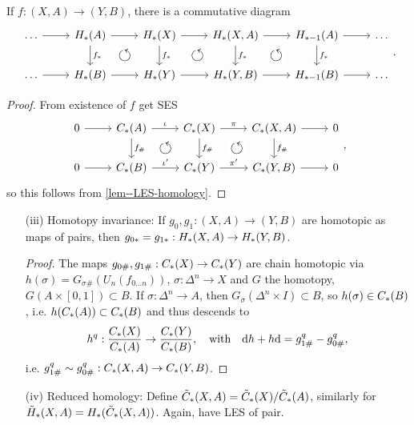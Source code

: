 \documentclass[a4paper,11pt]{article}
\begin{document}
				\begin{cor}
					If $f:(X,A)\rightarrow (Y,B)$, there is a commutative diagram
					\begin{equation*}
						\begin{tikzcd}
							\dots\ar[r]& \hg{A}\ar[d,"f_\ast"]\ar[r]& \hg{X}\ar[d,"f_\ast"]\ar[r]& \hg{X,A}\ar[d,"f_\ast"]\ar[r]& \hg[\ast-1]{A}\ar[d,"f_\ast"]\ar[r]& \dots\\
							\dots\ar[r]& \hg{B}\arrow[ur, phantom, "\scalebox{1.5}{$\circlearrowleft$}" description]\ar[r]& \hg{Y}\arrow[ur, phantom, "\scalebox{1.5}{$\circlearrowleft$}" description]\ar[r]& \hg{Y,B}\arrow[ur, phantom, "\scalebox{1.5}{$\circlearrowleft$}" description]\ar[r]& \hg[\ast-1]{B}\ar[r]& \dots
						\end{tikzcd}.
					\end{equation*}
				\end{cor}
				\begin{proof}
					From existence of $f$ get SES
					\begin{equation*}
						\begin{tikzcd}
							0\ar[r]& \cx{A} \ar[d,"f_\#"]\ar[r,"\iota"]& \cx{X} \ar[d,"f_\#"]\ar[r,"\pi"]& \cx{X,A} \ar[d,"f_\#"]\ar[r]& 0\\
							0\ar[r]& \cx{B}\arrow[ur, phantom, "\scalebox{1.5}{$\circlearrowleft$}" description] \ar[r,"\iota^{\prime}"]& \cx{Y}\arrow[ur, phantom, "\scalebox{1.5}{$\circlearrowleft$}" description] \ar[r,"\pi^{\prime}"]& \cx{Y,B} \ar[r]& 0
						\end{tikzcd},
					\end{equation*}
					so this follows from \autoref{lem--LES-homology}.
				\end{proof}
				
				\begin{enumerate}
					\item[(iii)] Homotopy invariance: If $g_{0},g_{1}:(X,A)\rightarrow (Y,B)$ are homotopic as maps of pairs, then $g_{0\ast}=g_{1\ast}:H_{\ast}(X,A)\rightarrow H_{\ast}(Y,B)$.
					\begin{proof}
						The maps $g_{0\#},g_{1\#}:C_{\ast}(X)\rightarrow C_{\ast}(Y)$ are chain homotopic via $h(\sigma)=G_{\sigma\#}(U_n(f_{0\dots n}))$, $\sigma:\Delta^n\rightarrow X$ and $G$ the homotopy, $G(A\times[0,1])\subset B$. If $\sigma:\Delta^n\rightarrow A$, then $G_{\sigma}(\Delta^n\times I)\subset B$, so $h(\sigma)\in C_{\ast}(B)$, i.e. $h(C_{\ast}(A))\subset C_{\ast}(B)$ and thus descends to 
						\begin{equation*}
							h^{q}:\frac{C_{\ast}(X)}{C_{\ast}(A)}\rightarrow \frac{C_{\ast}(Y)}{C_{\ast}(B)},\quad\text{with}\quad \mathrm{d}h+h\mathrm{d}=g_{1\#}^{q}-g_{0\#}^{q},
						\end{equation*}
						i.e. $g_{1\#}^{q}\sim g_{0\#}^{q}:C_{\ast}(X,A)\rightarrow C_{\ast}(Y,B)$.
					\end{proof}
					\item[(iv)] Reduced homology: Define $\tilde{C}_\ast(X,A)=\tilde{C}_{\ast}(X)/\tilde{C}_{\ast}(A)$, similarly for $\tilde{H}_{\ast}(X,A)=H_{\ast}(\tilde{C}_{\ast}(X,A))$. Again, have LES of pair.   
				\end{enumerate}
\end{document}
